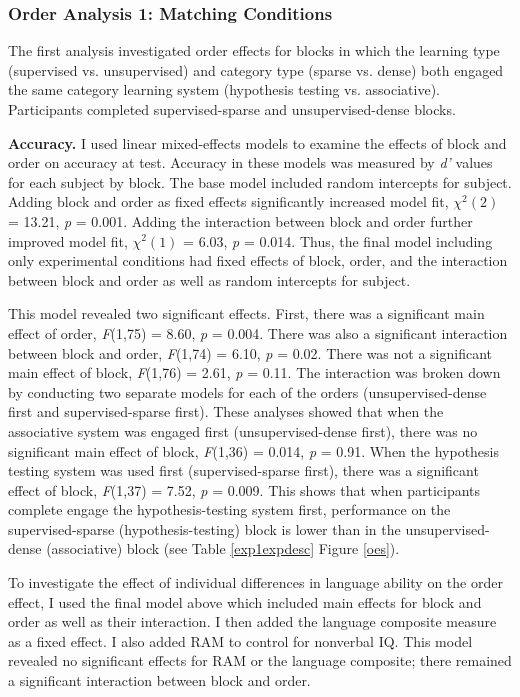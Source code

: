 \documentclass[../dissertation.tex]{subfiles}
\begin{document}
		
\subsubsection{Order Analysis 1: Matching Conditions}
	The first analysis investigated order effects for blocks in which the learning type (supervised vs. unsupervised) and category type (sparse vs. dense) both engaged the same category learning system (hypothesis testing vs. associative). Participants completed supervised-sparse and unsupervised-dense blocks.  \par
	\textbf{Accuracy.} I used linear mixed-effects models to examine the effects of block and order on accuracy at test. Accuracy in these models was measured by \textit{d'} values for each subject by block. The base model included random intercepts for subject. Adding block and order as fixed effects significantly increased model fit, $\chi^{2}(2)$ = 13.21,  \textit{p} = 0.001. Adding the interaction between block and order further improved model fit, $\chi^{2}(1)$ = 6.03,  \textit{p} = 0.014. Thus, the final model including only experimental conditions had fixed effects of block, order, and the interaction between block and order as well as random intercepts for subject. \par
	This model revealed two significant effects. First, there was a significant main effect of order, \textit{F}(1,75) = 8.60, \textit{p} = 0.004. There was also a significant interaction between block and order, \textit{F}(1,74) = 6.10, \textit{p} = 0.02. There was not a significant main effect of block, \textit{F}(1,76) = 2.61, \textit{p} = 0.11. The interaction was broken down by conducting two separate models for each of the orders (unsupervised-dense first and supervised-sparse first). These analyses showed that when the associative system was engaged first (unsupervised-dense first), there was no significant main effect of block, \textit{F}(1,36) = 0.014, \textit{p} = 0.91. When the hypothesis testing system was used first (supervised-sparse first), there was a significant effect of block, \textit{F}(1,37) = 7.52, \textit{p} = 0.009. This shows that when participants complete engage the hypothesis-testing system first, performance on the supervised-sparse (hypothesis-testing) block is lower than in the unsupervised-dense (associative) block (see Table \ref {exp1expdesc} Figure \ref{oes}). \par
	To investigate the effect of individual differences in language ability on the order effect, I used the final model above which included main effects for block and order as well as their interaction. I then added  the language composite measure as a fixed effect. I also added RAM to control for nonverbal IQ. This model revealed no significant effects for RAM or the language composite; there remained a significant interaction between block and order. \par
\end{document}
